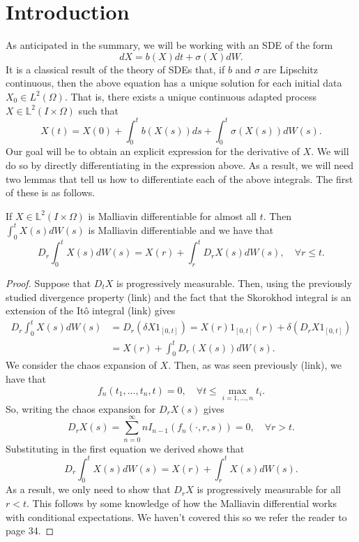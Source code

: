 \documentclass[
    a4paper,
    DIV=14,
    abstract=true,
    numbers=noenddot
]{scrartcl}
\begin{document}
\section{Introduction}
As anticipated in the summary, we will be working with an SDE of the form
\begin{equation}\label{SDE}
	dX=b(X) d t +\sigma (X)dW .
\end{equation}
It is a classical result of the theory of SDEs that, if $b$ and  $\sigma $ are Lipschitz continuous, then the above equation has a unique solution for each initial data $X_0\in L^2(\Omega)$. That is, there exists a unique continuous adapted process $X\in \mathbb{L}^2(I\times\Omega)$ such that
\begin{equation}\label{X expression}
	X(t)=X(0)+\int_{0}^t b(X(s)) ds+\int_{0}^t \sigma(X(s))  dW(s).
\end{equation}
Our goal will be to obtain an explicit expression for the derivative of $X$. We will do so by directly differentiating in the expression above. As a result, we will need two lemmas that tell us how to differentiate each of the above integrals. The first of these is as follows.
\begin{lemma}
	If $X\in \mathbb{L}^2(I\times\Omega)$ is  Malliavin differentiable for almost all $t$. Then $\int_{0}^t X(s) dW(s)$ is Malliavin differentiable and we have that
	\begin{equation*}
		D_r \int_{0}^t X(s) dW(s)=X(r)+\int_{r}^t D_r X(s) dW(s), \quad\forall r\leq t.
	\end{equation*}
\end{lemma}
\begin{proof}
	Suppose that $D_tX$ is progressively measurable. Then, using the previously studied divergence property (link) and the fact that the Skorokhod integral is an extension of the Itô integral (link) gives
	\begin{align*}
		D_r \int_{0}^t X(s) dW(s) & =D_r(\delta X1_{[0,t]}) =X(r)1_{[0,t]}(r)+\delta (D_rX1_{[0,t]}) \\&=X(r)+\int_{0}^t D_r(X(s)) dW(s).
	\end{align*}
	We consider the chaos expansion of $X$. Then, as was seen previously (link), we have that
	\begin{equation*}
		f_n(t_1,\ldots,t_n,t)=0,\quad\forall t\leq\max_{i=1,\ldots,n} t_i .
	\end{equation*}
	So, writing the chaos expansion for $D_rX(s)$  gives
	\begin{equation*}
		D_rX(s)=\sum_{n=0}^{\infty}  nI_{n-1}(f_n(\cdot ,r,s))=0, \quad\forall r>t.
	\end{equation*}
	Substituting in the first equation we derived shows that
	\begin{equation*}
		D_r \int_{0}^t X(s) dW(s)=X(r)+\int_{r}^t X(s) dW(s).
	\end{equation*}
	As a result, we only need to show that $D_r X$ is progressively measurable for all $r<t$.	This follows by some knowledge of how the Malliavin differential works with conditional expectations. We haven't covered this so we refer the reader to \cite{nunno2008malliavin} page 34.
\end{proof}
\end{document}
